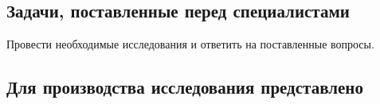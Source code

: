 \setcounter{page}{1}

%

\subsection{Задачи, поставленные перед специалистами}

Провести необходимые исследования и ответить на поставленные вопросы.

\subsection{Для производства исследования представлено}


%
%

%
